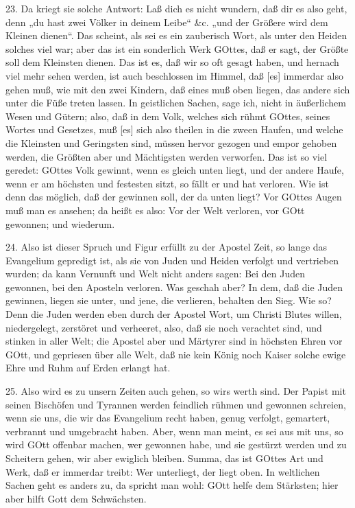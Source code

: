 23. Da kriegt sie solche Antwort: Laß dich es nicht wundern, daß dir es also geht, denn „du hast zwei Völker in deinem Leibe“ \&c. „und der Größere wird dem Kleinen dienen“. Das scheint, als sei es ein zauberisch Wort, als unter den Heiden solches viel war; aber das ist ein sonderlich Werk GOttes, daß er sagt, der Größte soll dem Kleinsten dienen. Das ist es, daß wir so oft gesagt haben, und hernach viel mehr sehen werden, ist auch beschlossen im Himmel, daß [es] immerdar also gehen muß, wie mit den zwei Kindern, daß eines muß oben liegen, das andere sich unter die Füße treten lassen. In geistlichen Sachen, sage ich, nicht in äußerlichem Wesen und Gütern; also, daß in dem Volk, welches sich rühmt GOttes, seines Wortes und Gesetzes, muß [es] sich also theilen in die zween Haufen, und welche die Kleinsten und Geringsten sind, müssen hervor gezogen und empor gehoben werden, die Größten aber und Mächtigsten werden verworfen. Das ist so viel geredet: GOttes Volk gewinnt, wenn es gleich unten liegt, und der andere Haufe, wenn er am höchsten und festesten sitzt, so fällt er und hat verloren. Wie ist denn das möglich, daß der gewinnen soll, der da unten liegt? Vor GOttes Augen muß man es ansehen; da heißt es also: Vor der Welt verloren, vor GOtt gewonnen; und wiederum.

24. Also ist dieser Spruch und Figur erfüllt zu der Apostel Zeit, so lange das Evangelium gepredigt ist, als sie von Juden und Heiden verfolgt und vertrieben wurden; da kann Vernunft und Welt nicht anders sagen: Bei den Juden gewonnen, bei den Aposteln verloren. Was geschah aber? In dem, daß die Juden gewinnen, liegen sie unter, und jene, die verlieren, behalten den Sieg. Wie so? Denn die Juden werden eben durch der Apostel Wort, um Christi Blutes willen, niedergelegt, zerstöret und verheeret, also, daß sie noch verachtet sind, und stinken in aller Welt; die Apostel aber und Märtyrer sind in höchsten Ehren vor GOtt, und gepriesen über alle Welt, daß nie kein König noch Kaiser solche ewige Ehre und Ruhm auf Erden erlangt hat.

25. Also wird es zu unsern Zeiten auch gehen, so wirs werth sind. Der Papist mit seinen Bischöfen und Tyrannen werden feindlich rühmen und gewonnen schreien, wenn sie uns, die wir das Evangelium recht haben, genug verfolgt, gemartert, verbrannt und umgebracht haben. Aber, wenn man meint, es sei aus mit uns, so wird GOtt offenbar machen, wer gewonnen habe, und sie gestürzt werden und zu Scheitern gehen, wir aber ewiglich bleiben. Summa, das ist GOttes Art und Werk, daß er immerdar treibt: Wer unterliegt, der liegt oben. In weltlichen Sachen geht es anders zu, da spricht man wohl: GOtt helfe dem Stärksten; hier aber hilft Gott dem Schwächsten.

